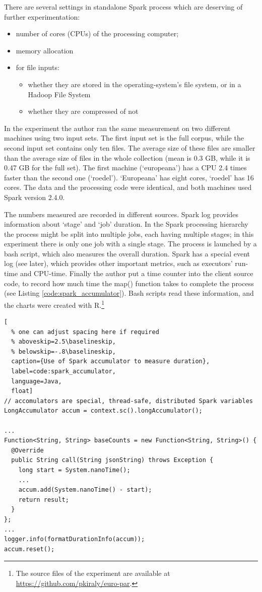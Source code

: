 There are several settings in standalone Spark process which are deserving of further experimentation:
\begin{itemize}
 \setlength{\parskip}{0pt}
 \setlength{\itemsep}{0pt plus 1pt}
 \item number of cores (CPUs) of the processing computer;
 \item memory allocation
 \item for file inputs:
 \begin{itemize}
  \setlength{\parskip}{0pt}
  \setlength{\itemsep}{0pt plus 1pt}
  \item whether they are stored in the operating-system's file system, or in a Hadoop File System
  \item whether they are compressed of not
 \end{itemize}
\end{itemize}

In the experiment the author ran the same measurement on two different machines using two input sets. The first input set is the full corpus, while the second input set contains only ten files. The average size of these files are smaller than the average size of files in the whole collection (mean is 0.3 GB, while it is 0.47 GB for the full set). The first machine (`europeana') has a CPU 2.4 times faster than the second one (`roedel'). `Europeana' has eight cores, `roedel' has 16 cores. The data and the processing code were identical, and both machines used Spark version 2.4.0.

The numbers measured are recorded in different sources. Spark log provides information about `stage' and `job' duration. In the Spark processing hierarchy the process might be split into multiple jobs, each having multiple stages; in this experiment there is only one job with a single stage. The process is launched by a bash script, which also measures the overall duration. Spark has a special event log (see later), which provides other important metrics, such as executors' run-time and CPU-time. Finally the author put a time counter into the client source code, to record how much time the map() function takes to complete the process (see Listing \ref{code:spark_accumulator}). Bash scripts read these information, and the charts were created with R.\footnote{The source files of the experiment are available at \url{https://github.com/pkiraly/euro-par}.}

\begin{lstlisting}[
  % one can adjust spacing here if required
  % aboveskip=2.5\baselineskip,
  % belowskip=-.8\baselineskip,
  caption={Use of Spark accumulator to measure duration},
  label=code:spark_accumulator,
  language=Java,
  float]
// accomulators are special, thread-safe, distributed Spark variables
LongAccumulator accum = context.sc().longAccumulator();

...
Function<String, String> baseCounts = new Function<String, String>() {
  @Override
  public String call(String jsonString) throws Exception {
    long start = System.nanoTime();
    ...
	accum.add(System.nanoTime() - start);
    return result;
  }
};
...
logger.info(formatDurationInfo(accum));
accum.reset();
\end{lstlisting}

